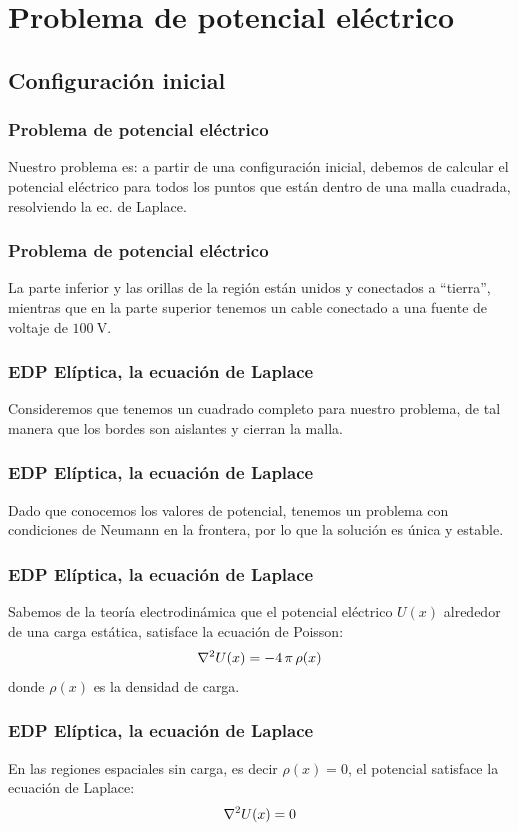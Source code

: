 \section{Problema de potencial eléctrico}
\subsection{Configuración inicial}
\begin{frame}
\frametitle{Problema de potencial eléctrico}
Nuestro problema es: a partir de una configuración inicial, debemos de calcular el potencial eléctrico para todos los puntos que están dentro de una malla cuadrada, resolviendo la ec. de Laplace.
\end{frame}
\begin{frame}
\frametitle{Problema de potencial eléctrico}
La parte inferior y las orillas de la región están unidos y conectados a \enquote{tierra}, mientras que en la parte superior tenemos un cable conectado a una fuente de voltaje de $\SI{100}{\volt}$.
\begin{figure}
	\centering
	
\end{figure}
\end{frame}
\begin{frame}
\frametitle{EDP Elíptica, la ecuación de Laplace}
Consideremos que tenemos un cuadrado completo para nuestro problema, de tal manera que los bordes son aislantes y cierran la malla.
\end{frame}
\begin{frame}
\frametitle{EDP Elíptica, la ecuación de Laplace}
Dado que conocemos los valores de potencial, tenemos un problema con condiciones de Neumann en la frontera, por lo que la solución es única y estable.
\end{frame}
\begin{frame}
\frametitle{EDP Elíptica, la ecuación de Laplace}
Sabemos de la teoría electrodinámica que el potencial eléctrico $U(x)$ alrededor de una carga estática, satisface la ecuación de Poisson:
\begin{align*}
\laplacian{U(x)} = - 4 \, \pi \, \rho(x)
\end{align*}
donde $\rho(x)$ es la densidad de carga.
\end{frame}
\begin{frame}
\frametitle{EDP Elíptica, la ecuación de Laplace}
En las regiones espaciales sin carga, es decir $\rho(x)=0$, el potencial satisface la ecuación de Laplace:
\begin{align*}
\laplacian{U(x)} = 0
\end{align*}
\end{frame}
